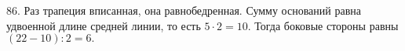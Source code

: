 86. Раз трапеция вписанная, она равнобедренная. Сумму оснований равна удвоенной длине средней линии, то есть $5\cdot2=10.$ Тогда боковые стороны равны $(22-10):2=6.$\newpage\noindent
